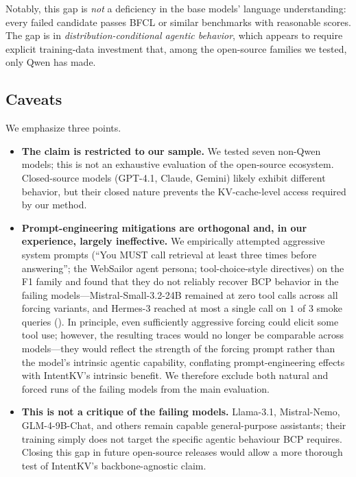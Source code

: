 \documentclass[11pt]{article}
\newcommand{\method}{IntentKV\xspace}
\begin{document}
Notably, this gap is \emph{not} a deficiency in the base models'
language understanding: every failed candidate passes BFCL or similar
benchmarks with reasonable scores. The gap is in
\textit{distribution-conditional agentic behavior}, which appears to
require explicit training-data investment that, among the open-source
families we tested, only Qwen has made.

\subsection{Caveats}

We emphasize three points.

\begin{itemize}[itemsep=2pt,parsep=0pt,topsep=2pt]
\item \textbf{The claim is restricted to our sample.}
We tested seven non-Qwen models; this is not an exhaustive evaluation of
the open-source ecosystem. Closed-source models (GPT-4.1, Claude,
Gemini) likely exhibit different behavior, but their closed nature
prevents the KV-cache-level access required by our method.

\item \textbf{Prompt-engineering mitigations are orthogonal and, in
our experience, largely ineffective.}
We empirically attempted aggressive system prompts (``You MUST call
retrieval at least three times before answering''; the WebSailor
agent persona; tool-choice-style directives) on the F1 family and
found that they do not reliably recover BCP behavior in the failing
models---Mistral-Small-3.2-24B remained at zero tool calls across
all forcing variants, and Hermes-3 reached at most a single call on
$1$ of $3$ smoke queries (). In
principle, even sufficiently aggressive forcing could elicit some
tool use; however, the resulting traces would no longer be comparable
across models---they would reflect the strength of the forcing prompt
rather than the model's intrinsic agentic capability, conflating
prompt-engineering effects with \method{}'s intrinsic benefit. We
therefore exclude both natural and forced runs of the failing models
from the main evaluation.

\item \textbf{This is not a critique of the failing models.}
Llama-3.1, Mistral-Nemo, GLM-4-9B-Chat, and others remain capable
general-purpose assistants; their training simply does not target the
specific agentic behaviour BCP requires. Closing this gap in future
open-source releases would allow a more thorough test of
\method{}'s backbone-agnostic claim.
\end{itemize}
\end{document}
